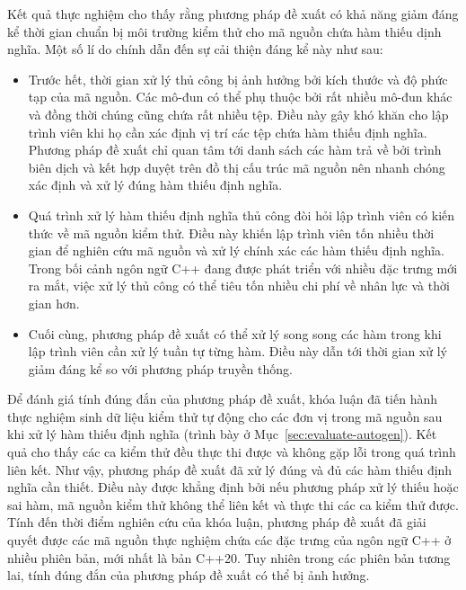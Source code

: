 Kết quả thực nghiệm cho thấy rằng phương pháp đề xuất có khả năng giảm đáng kể thời gian chuẩn bị môi trường kiểm thử cho mã nguồn chứa hàm thiếu dịnh nghĩa. Một số lí do chính dẫn đến sự cải thiện đáng kể này như sau:
\begin{itemize}
    \item Trước hết, thời gian xử lý thủ công bị ảnh hưởng bởi kích thước và độ phức tạp của mã nguồn. Các mô-đun có thể phụ thuộc bởi rất nhiều mô-đun khác và đồng thời chúng cũng chứa rất nhiều tệp. Điều này gây khó khăn cho lập trình viên khi họ cần xác định vị trí các tệp chứa hàm thiếu định nghĩa. Phương pháp đề xuất chỉ quan tâm tới danh sách các hàm trả về bởi trình biên dịch và kết hợp duyệt trên đồ thị cấu trúc mã nguồn nên nhanh chóng xác định và xử lý đúng hàm thiếu định nghĩa.
    \item Quá trình xử lý hàm thiếu định nghĩa thủ công đòi hỏi lập trình viên có kiến thức về mã nguồn kiểm thử. Điều này khiến lập trình viên tốn nhiều thời gian để nghiên cứu mã nguồn và xử lý chính xác các hàm thiếu định nghĩa. Trong bối cảnh ngôn ngữ C++ đang được phát triển với nhiều đặc trưng mới ra mắt, việc xử lý thủ công có thể tiêu tốn nhiều chi phí về nhân lực và thời gian hơn.
    \item Cuối cùng, phương pháp đề xuất có thể xử lý song song các hàm trong khi lập trình viên cần xử lý tuần tự từng hàm. Điều này dẫn tới thời gian xử lý giảm đáng kể so với phương pháp truyền thống.
\end{itemize}

Để đánh giá tính đúng đắn của phương pháp đề xuất, khóa luận đã tiến hành thực nghiệm sinh dữ liệu kiểm thử tự động cho các đơn vị trong mã nguồn sau khi xử lý hàm thiếu định nghĩa (trình bày ở Mục~\ref{sec:evaluate-autogen}). Kết quả cho thấy các ca kiểm thử đều thực thi được và không gặp lỗi trong quá trình liên kết. Như vậy, phương pháp đề xuất đã xử lý đúng và đủ các hàm thiếu định nghĩa cần thiết. Điều này được khẳng định bởi nếu phương pháp xử lý thiếu hoặc sai hàm, mã nguồn kiểm thử không thể liên kết và thực thi các ca kiểm thử được. Tính đến thời điểm nghiên cứu của khóa luận, phương pháp đề xuất đã giải quyết được các mã nguồn thực nghiệm chứa các đặc trưng của ngôn ngữ C++ ở nhiều phiên bản, mới nhất là bản C++20. Tuy nhiên trong các phiên bản tương lai, tính đúng đắn của phương pháp đề xuất có thể bị ảnh hưởng.

